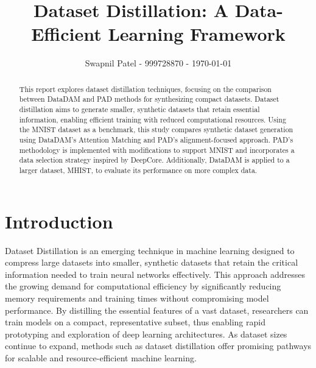 \documentclass[conference, compsoc]{IEEEtran}
\begin{document}
	\title{Dataset Distillation: A Data-Efficient Learning Framework}
	\author{Swapnil Patel - 999728870 - \today}
	
	\author{
		}
	
	\maketitle
	
	\begin{abstract}
	\label{sec:abstract}
	This report explores dataset distillation techniques, focusing on the comparison between DataDAM and PAD methods for synthesizing compact datasets. Dataset distillation aims to generate smaller, synthetic datasets that retain essential information, enabling efficient training with reduced computational resources. Using the MNIST dataset as a benchmark, this study compares synthetic dataset generation using DataDAM’s Attention Matching and PAD’s alignment-focused approach. PAD’s methodology is implemented with modifications to support MNIST and incorporates a data selection strategy inspired by DeepCore. Additionally, DataDAM is applied to a larger dataset, MHIST, to evaluate its performance on more complex data.
	\end{abstract}
	
	\section{Introduction}
	\label{sec:intro}
	
	Dataset Distillation is an emerging technique in machine learning designed to compress large datasets into smaller, synthetic datasets that retain the critical information needed to train neural networks effectively. This approach addresses the growing demand for computational efficiency by significantly reducing memory requirements and training times without compromising model performance. By distilling the essential features of a vast dataset, researchers can train models on a compact, representative subset, thus enabling rapid prototyping and exploration of deep learning architectures. As dataset sizes continue to expand, methods such as dataset distillation offer promising pathways for scalable and resource-efficient machine learning. 
	
\end{document}
